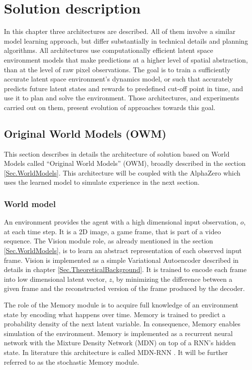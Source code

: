 \section{Solution description} \label{Sec.SolutionDescription}

In this chapter three architectures are described. All of them involve a similar model learning approach, but differ substantially in technical details and planning algorithms. All architectures use computationally efficient latent space environment models that make predictions at a higher level of spatial abstraction, than at the level of raw pixel observations. The goal is to train a sufficiently accurate latent space environment's dynamics model, or such that accurately predicts future latent states and rewards to predefined cut-off point in time, and use it to plan and solve the environment. Those architectures, and experiments carried out on them, present evolution of approaches towards this goal.

\subsection{Original World Models (OWM)}

This section describes in details the architecture of solution based on World Models \cite{Algo.WorldModels} called ``Original World Models'' (OWM), broadly described in the section \ref{Sec.WorldModels}. This architecture will be coupled with the AlphaZero which uses the learned model to simulate experience in the next section.

\subsubsection{World model}

An environment provides the agent with a high dimensional input observation, $o$, at each time step. It is a 2D image, a game frame, that is part of a video sequence. The Vision module role, as already mentioned in the section \ref{Sec.WorldModels}, is to learn an abstract representation of each observed input frame. Vision is implemented as a simple Variational Autoencoder described in details in chapter \ref{Sec.TheoreticalBackground}. It is trained to encode each frame into low dimensional latent vector, $z$, by minimizing the difference between a given frame and the reconstructed version of the frame produced by the decoder.

The role of the Memory module is to acquire full knowledge of an environment state by encoding what happens over time. Memory is trained to predict a probability density of the next latent variable. In consequence, Memory enables simulation of the environment. Memory is implemented as a recurrent neural network with the Mixture Density Network (MDN) on top of a RNN's hidden state. In literature this architecture is called MDN-RNN \cite{Algo.MDNRNN}. It will be further referred to as the stochastic Memory module.

